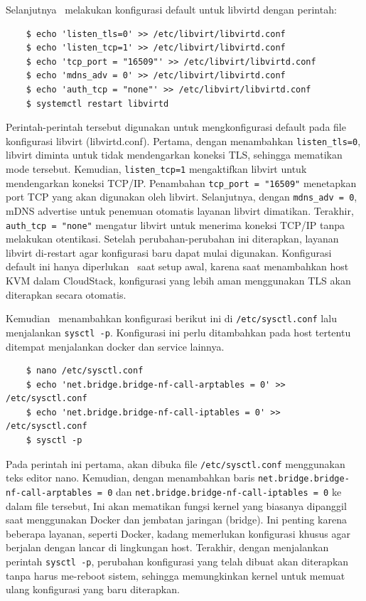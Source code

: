 Selanjutnya \saya\ melakukan konfigurasi default untuk libvirtd dengan perintah:

\begin{listing}[H]
    \begin{verbatim}
    $ echo 'listen_tls=0' >> /etc/libvirt/libvirtd.conf
    $ echo 'listen_tcp=1' >> /etc/libvirt/libvirtd.conf
    $ echo 'tcp_port = "16509"' >> /etc/libvirt/libvirtd.conf
    $ echo 'mdns_adv = 0' >> /etc/libvirt/libvirtd.conf
    $ echo 'auth_tcp = "none"' >> /etc/libvirt/libvirtd.conf
    $ systemctl restart libvirtd
    \end{verbatim}
\end{listing}

Perintah-perintah tersebut digunakan untuk mengkonfigurasi default pada file konfigurasi libvirt (libvirtd.conf). Pertama, dengan menambahkan \texttt{listen\_tls=0}, libvirt diminta untuk tidak mendengarkan koneksi TLS, sehingga mematikan mode tersebut. Kemudian, \texttt{listen\_tcp=1} mengaktifkan libvirt untuk mendengarkan koneksi TCP/IP. Penambahan \texttt{tcp\_port = "16509"} menetapkan port TCP yang akan digunakan oleh libvirt. Selanjutnya, dengan \texttt{mdns\_adv = 0}, mDNS advertise untuk penemuan otomatis layanan libvirt dimatikan. Terakhir, \texttt{auth\_tcp = "none"} mengatur libvirt untuk menerima koneksi TCP/IP tanpa melakukan otentikasi. Setelah perubahan-perubahan ini diterapkan, layanan libvirt di-restart agar konfigurasi baru dapat mulai digunakan. Konfigurasi default ini hanya diperlukan \saya\ saat setup awal, karena saat menambahkan host KVM dalam CloudStack, konfigurasi yang lebih aman menggunakan TLS akan diterapkan secara otomatis.

Kemudian \saya\ menambahkan konfigurasi berikut ini di \texttt{/etc/sysctl.conf} lalu menjalankan \texttt{sysctl -p}. Konfigurasi ini perlu ditambahkan pada host tertentu ditempat menjalankan docker dan service lainnya.

\begin{listing}[H]
    \begin{verbatim}       
    $ nano /etc/sysctl.conf
    $ echo 'net.bridge.bridge-nf-call-arptables = 0' >> /etc/sysctl.conf
    $ echo 'net.bridge.bridge-nf-call-iptables = 0' >> /etc/sysctl.conf
    $ sysctl -p
    \end{verbatim}
\end{listing}

Pada perintah ini pertama, akan dibuka file \texttt{/etc/sysctl.conf} menggunakan teks editor nano. Kemudian, dengan menambahkan baris \texttt{net.bridge.bridge-nf-call-arptables = 0} dan \texttt{net.bridge.bridge-nf-call-iptables = 0} ke dalam file tersebut, Ini akan mematikan fungsi kernel yang biasanya dipanggil saat menggunakan Docker dan jembatan jaringan (bridge). Ini penting karena beberapa layanan, seperti Docker, kadang memerlukan konfigurasi khusus agar berjalan dengan lancar di lingkungan host. Terakhir, dengan menjalankan perintah \texttt{sysctl -p}, perubahan konfigurasi yang telah dibuat akan diterapkan tanpa harus me-reboot sistem, sehingga memungkinkan kernel untuk memuat ulang konfigurasi yang baru diterapkan.

